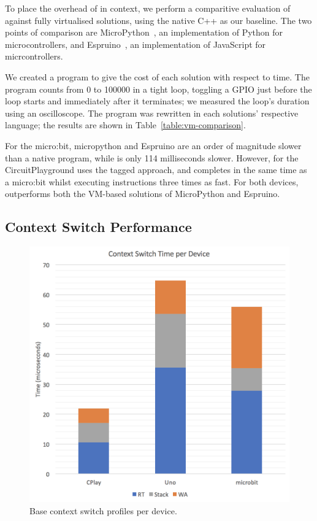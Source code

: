 To place the overhead of \MC in context, we perform a comparitive evaluation of \MC against fully virtualised solutions, using the native C++ as our baseline. The two points of comparison are MicroPython~\cite{MicroPython}, an implementation of Python for microcontrollers, and Espruino~\cite{espruinoBook}, an implementation of JavaScript for micrcontrollers.

We created a program to give the cost of each solution with respect to time. The program counts from 0 to 100000 in a tight loop, toggling a GPIO just before the loop starts and immediately after it terminates; we measured the loop's duration using an oscilloscope. The program was rewritten in each solutions' respective language; the results are shown in Table~\ref{table:vm-comparison}.

For the micro:bit, micropython and Espruino are an order of magnitude slower than a native \CO program, while \MC is only 114 milliseconds slower. However, \MC for the CircuitPlayground uses the tagged approach, and completes in the same time as a micro:bit whilst executing instructions three times as fast. For both devices, \MC outperforms both the VM-based solutions of MicroPython and Espruino.

\subsection{Context Switch Performance}

\begin{figure}[ht]
    \includegraphics[width=.6\columnwidth]{images/context-switch.png}
\caption{\label{fig:context-switch}Base context switch profiles per device.}
\end{figure}

